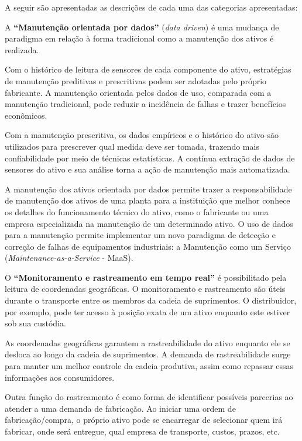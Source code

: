 A seguir são apresentadas as descrições de cada uma das categorias apresentadas:

A \textbf{``Manutenção orientada por dados''} (\textit{data driven}) é uma mudança de paradigma em relação à forma tradicional como a manutenção dos ativos é realizada.

Com o histórico de leitura de sensores de cada componente do ativo, estratégias de manutenção preditivas e prescritivas podem ser adotadas pelo próprio fabricante. A manutenção orientada pelos dados de uso, comparada com a manutenção tradicional, pode reduzir a incidência de falhas e trazer benefícios econômicos. %

Com a manutenção prescritiva, os dados empíricos e o histórico do ativo são utilizados para prescrever qual medida deve ser tomada, trazendo mais confiabilidade por meio de técnicas estatísticas. A contínua extração de dados de sensores do ativo e sua análise torna a ação de manutenção mais automatizada.

A manutenção dos ativos orientada por dados permite trazer a responsabilidade de manutenção dos ativos de uma planta para a instituição que melhor conhece os detalhes do funcionamento técnico do ativo, como o fabricante ou uma empresa especializada na manutenção de um determinado ativo. O uso de dados para a manutenção permite implementar um novo paradigma de detecção e correção de falhas de equipamentos industriais: a Manutenção como um Serviço (\textit{Maintenance-as-a-Service} - MaaS). %

O \textbf{``Monitoramento e rastreamento em tempo real''} é possibilitado pela leitura de coordenadas geográficas. O monitoramento e rastreamento são úteis durante o transporte entre os membros da cadeia de suprimentos. O distribuidor, por exemplo, pode ter acesso à posição exata de um ativo enquanto este estiver sob sua custódia.

As coordenadas geográficas garantem a rastreabilidade do ativo enquanto ele se desloca ao longo da cadeia de suprimentos. A demanda de rastreabilidade surge para manter um melhor controle da cadeia produtiva, assim como repassar essas informações aos consumidores.

Outra função do rastreamento é como forma de identificar possíveis parcerias ao atender a uma demanda de fabricação. Ao iniciar uma ordem de fabricação/compra, o próprio ativo pode se encarregar de selecionar quem irá fabricar, onde será entregue, qual empresa de transporte, custos, prazos, etc.

